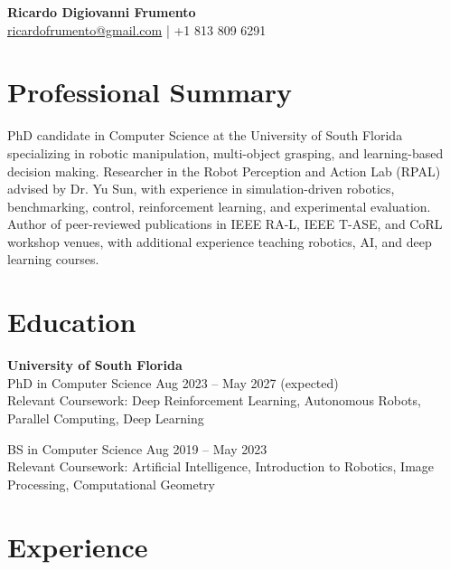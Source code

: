 \documentclass[a4paper,10pt]{article}
\begin{document}
\begin{center}
    {\LARGE \textbf{Ricardo Digiovanni Frumento}} \\
    \vspace{2mm}
    \href{mailto:ricardofrumento@gmail.com}{ricardofrumento@gmail.com} \hspace{1em} | \hspace{1em}
    +1 813 809 6291 \\
\end{center}

\vspace{2mm}

\section*{Professional Summary}
PhD candidate in Computer Science at the University of South Florida specializing in robotic manipulation, multi-object grasping, and learning-based decision making. Researcher in the Robot Perception and Action Lab (RPAL) advised by Dr. Yu Sun, with experience in simulation-driven robotics, benchmarking, control, reinforcement learning, and experimental evaluation. Author of peer-reviewed publications in IEEE RA-L, IEEE T-ASE, and CoRL workshop venues, with additional experience teaching robotics, AI, and deep learning courses.

\section*{Education}
\textbf{University of South Florida} \\
PhD in Computer Science \hfill Aug 2023 -- May 2027 (expected) \\
Relevant Coursework: Deep Reinforcement Learning, Autonomous Robots, Parallel Computing, Deep Learning

BS in Computer Science \hfill Aug 2019 -- May 2023 \\
Relevant Coursework: Artificial Intelligence, Introduction to Robotics, Image Processing, Computational Geometry

\section*{Experience}
\end{document}
